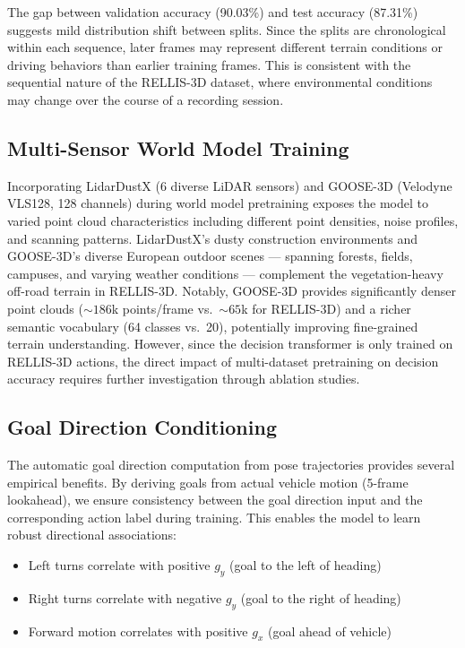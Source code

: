 \documentclass[journal]{IEEEtran}
\begin{document}
The gap between validation accuracy (90.03\%) and test accuracy (87.31\%) suggests mild distribution shift between splits. Since the splits are chronological within each sequence, later frames may represent different terrain conditions or driving behaviors than earlier training frames. This is consistent with the sequential nature of the RELLIS-3D dataset, where environmental conditions may change over the course of a recording session.

\subsection{Multi-Sensor World Model Training}

Incorporating LidarDustX (6 diverse LiDAR sensors) and GOOSE-3D (Velodyne VLS128, 128 channels) during world model pretraining exposes the model to varied point cloud characteristics including different point densities, noise profiles, and scanning patterns. LidarDustX's dusty construction environments and GOOSE-3D's diverse European outdoor scenes --- spanning forests, fields, campuses, and varying weather conditions --- complement the vegetation-heavy off-road terrain in RELLIS-3D. Notably, GOOSE-3D provides significantly denser point clouds (${\sim}186$k points/frame vs.\ ${\sim}65$k for RELLIS-3D) and a richer semantic vocabulary (64 classes vs.\ 20), potentially improving fine-grained terrain understanding. However, since the decision transformer is only trained on RELLIS-3D actions, the direct impact of multi-dataset pretraining on decision accuracy requires further investigation through ablation studies.

\subsection{Goal Direction Conditioning}

The automatic goal direction computation from pose trajectories provides several empirical benefits. By deriving goals from actual vehicle motion (5-frame lookahead), we ensure consistency between the goal direction input and the corresponding action label during training. This enables the model to learn robust directional associations:
\begin{itemize}
    \item Left turns correlate with positive $g_y$ (goal to the left of heading)
    \item Right turns correlate with negative $g_y$ (goal to the right of heading)
    \item Forward motion correlates with positive $g_x$ (goal ahead of vehicle)
\end{itemize}
\end{document}
